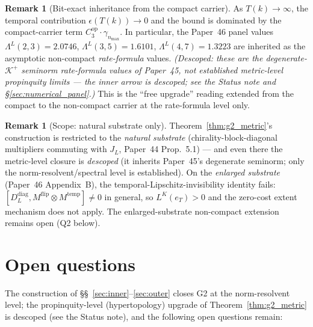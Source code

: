 \documentclass[11pt,a4paper]{article}
\theoremstyle{plain}
\theoremstyle{definition}
\newtheorem{remark}[theorem]{Remark}
\newcommand{\nmax}{n_{\max}}
\newcommand{\Krein}{\mathcal{K}}
\newcommand{\DL}{D_{L}}
\newcommand{\JL}{J_{L}}
\newcommand{\Lprop}{\Lambda^{L}}
\newcommand{\Cthreeop}{C_{3}^{\mathrm{op}}}
\newcommand{\Kplus}{\Krein^{+}}
\newcommand{\temp}{\mathrm{temp}}
\newcommand{\flip}{\mathrm{flip}}
\begin{document}
\begin{remark}[Bit-exact inheritance from the compact carrier]%
\label{rem:bit_exact_g2}
As $T(k) \to \infty$, the temporal contribution $\epsilon(T(k)) \to 0$
and the bound is dominated by the compact-carrier term
$\Cthreeop \cdot \gamma_{\nmax}$. In particular, the Paper~46 panel
values $\Lprop(2, 3) = 2.0746$, $\Lprop(3, 5) = 1.6101$,
$\Lprop(4, 7) = 1.3223$ are inherited as the asymptotic non-compact
\emph{rate-formula} values. \emph{(Descoped: these are the
degenerate-$\Kplus$ seminorm rate-formula values of Paper~45, not
established metric-level propinquity limits --- the inner arrow is
descoped; see the Status note and \S\ref{sec:numerical_panel}.)} This is
the ``free upgrade'' reading extended from the compact to the non-compact
carrier at the rate-formula level only.
\end{remark}

\begin{remark}[Scope: natural substrate only]%
\label{rem:g2_scope}
Theorem~\ref{thm:g2_metric}'s construction is restricted to the
\emph{natural substrate}
(chirality-block-diagonal multipliers commuting with $\JL$, Paper~44
Prop.~5.1) --- and even there the metric-level closure is
\emph{descoped} (it inherits Paper~45's degenerate seminorm; only the
norm-resolvent/spectral level is established). On the \emph{enlarged substrate}
(Paper~46 Appendix~B), the temporal-Lipschitz-invisibility identity
fails: $[\DL^{\mathrm{diag}}, M^{\flip} \otimes M^{\temp}] \neq 0$
in general, so $L^{K}(e_{T}) > 0$ and the zero-cost extent mechanism
does not apply. The enlarged-substrate non-compact extension
remains open (Q2 below).
\end{remark}

\section{Open questions}\label{sec:open}

The construction of \S\S~\ref{sec:inner}--\ref{sec:outer} closes G2
at the norm-resolvent level; the propinquity-level (hypertopology)
upgrade of Theorem~\ref{thm:g2_metric} is descoped (see the Status
note), and the following open questions remain:
\end{document}
